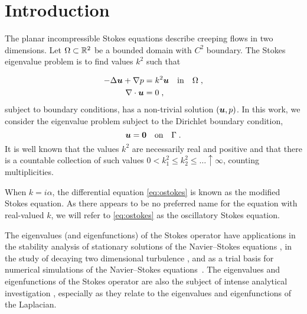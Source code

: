 \section{Introduction}

The planar incompressible Stokes equations describe
creeping flows in two dimensions.
%
Let $\Omega \subset \mathbb{R}^2$
be a bounded domain with $C^2$ boundary.
%
The Stokes eigenvalue problem is to find
values $k^2$ such that 

\begin{equation}
\begin{aligned}
  -\Delta {\boldsymbol u} + \nabla p &= k^2 {\boldsymbol u} \quad \textrm{in} \quad
  \Omega \label{eq:ostokes} \; , \\
  \nabla \cdot {\boldsymbol u} &= 0 \; ,
\end{aligned}
\end{equation}
subject to boundary conditions, has a non-trivial solution $({\boldsymbol u},p)$.
%
In this work, we consider the eigenvalue problem subject to 
the Dirichlet boundary condition,
\begin{equation}
  {\boldsymbol u} = {\boldsymbol 0} \quad \textrm{on} \quad \Gamma \label{eq:ostokes_dir} \; .
\end{equation}
It is well known that the values $k^2$ are necessarily
real and positive and that there is a countable collection of such
values $0 < k_{1}^{2} \leq k_{2}^2 \leq \ldots \uparrow \infty$,
counting multiplicities.

\begin{remark}
  When $k = i\alpha$, the differential equation
  \cref{eq:ostokes} is known as the modified Stokes
  equation. As there appears to be no preferred
  name for the equation with real-valued $k$,
  we will refer to \cref{eq:ostokes} as the
  oscillatory Stokes equation.
\end{remark}

The eigenvalues (and eigenfunctions)
of the Stokes operator have applications in the
stability analysis of stationary solutions of the
Navier--Stokes equations \cite{osborn1976approximation},
in the study of decaying two dimensional turbulence
\cite{schneider2008final}, and as a trial basis for
numerical simulations of the Navier--Stokes
equations~\cite{batcho1994generalized}.
%
The eigenvalues and eigenfunctions of the Stokes
operator are also the subject of intense analytical
investigation
\cite{taylor1933buckling,szego1950membranes,
  polya1951isoperimetric,bramble1963pointwise,
  ashbaugh1996fundamental,leriche2004stokes,
  kelliher2009eigenvalues,antunes2011buckling},
especially as they relate to the eigenvalues and
eigenfunctions of the Laplacian.

